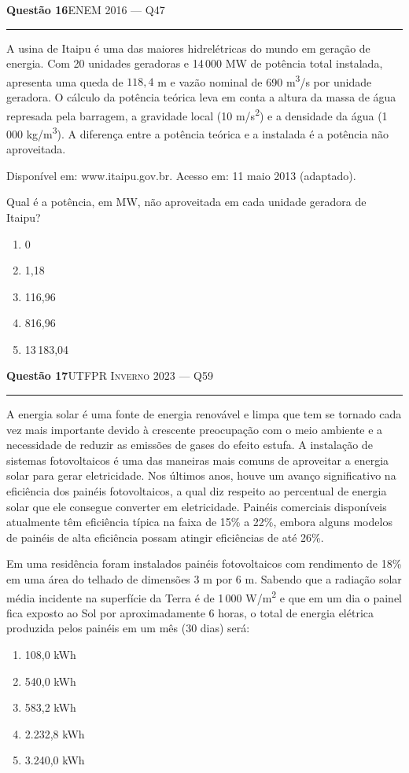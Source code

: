 \documentclass[11pt,a4paper]{article}
\newcommand{\fonte}[1]{{\small\scshape\color{grafite}#1}}
\newenvironment{questao}[2]{%
  \needspace{6\baselineskip}
  \par\addvspace{1.6em}
  {\large\bfseries\color{vinho}Quest\~ao #1}\hfill #2\\[-0.55em]
  {\color{black!25}\rule{\linewidth}{0.4pt}}
  \par\nobreak\smallskip
}{\par\addvspace{0.4em}}
\begin{document}
\begin{questao}{16}{\fonte{ENEM 2016 --- Q47}}
A usina de Itaipu \'e uma das maiores hidrel\'etricas do mundo em
gera\c{c}\~ao de energia. Com 20 unidades geradoras e 14\,000 MW de
pot\^encia total instalada, apresenta uma queda de $118{,}4$ m e
vaz\~ao nominal de 690 m\textsuperscript{3}/s por unidade geradora. O
c\'alculo da pot\^encia te\'orica leva em conta a altura da massa de
\'agua represada pela barragem, a gravidade local (10
m/s\textsuperscript{2}) e a densidade da \'agua (1\,000
kg/m\textsuperscript{3}). A diferen\c{c}a entre a pot\^encia
te\'orica e a instalada \'e a pot\^encia n\~ao aproveitada.
\begin{flushright}\small
Dispon\'ivel em: www.itaipu.gov.br. Acesso em: 11 maio 2013 (adaptado).
\end{flushright}

Qual \'e a pot\^encia, em MW, n\~ao aproveitada em cada unidade
geradora de Itaipu?
\begin{enumerate}
  \item 0
  \item 1,18
  \item 116,96
  \item 816,96
  \item 13\,183,04
\end{enumerate}
\end{questao}

\begin{questao}{17}{\fonte{UTFPR Inverno 2023 --- Q59}}
A energia solar \'e uma fonte de energia renov\'avel e limpa que tem
se tornado cada vez mais importante devido \`a crescente
preocupa\c{c}\~ao com o meio ambiente e a necessidade de reduzir as
emiss\~oes de gases do efeito estufa. A instala\c{c}\~ao de sistemas
fotovoltaicos \'e uma das maneiras mais comuns de aproveitar a energia
solar para gerar eletricidade. Nos \'ultimos anos, houve um
avan\c{c}o significativo na efici\^encia dos pain\'eis fotovoltaicos,
a qual diz respeito ao percentual de energia solar que ele consegue
converter em eletricidade. Pain\'eis comerciais dispon\'iveis
atualmente t\^em efici\^encia t\'ipica na faixa de 15\% a 22\%,
embora alguns modelos de pain\'eis de alta efici\^encia possam
atingir efici\^encias de at\'e 26\%.

Em uma resid\^encia foram instalados pain\'eis fotovoltaicos com
rendimento de 18\% em uma \'area do telhado de dimens\~oes 3 m por
6 m. Sabendo que a radia\c{c}\~ao solar m\'edia incidente na
superf\'icie da Terra \'e de 1\,000 W/m\textsuperscript{2} e que em um
dia o painel fica exposto ao Sol por aproximadamente 6 horas, o total
de energia el\'etrica produzida pelos pain\'eis em um m\^es
(30 dias) ser\'a:
\begin{enumerate}
  \item 108,0 kWh
  \item 540,0 kWh
  \item 583,2 kWh
  \item 2.232,8 kWh
  \item 3.240,0 kWh
\end{enumerate}
\end{questao}
\end{document}
